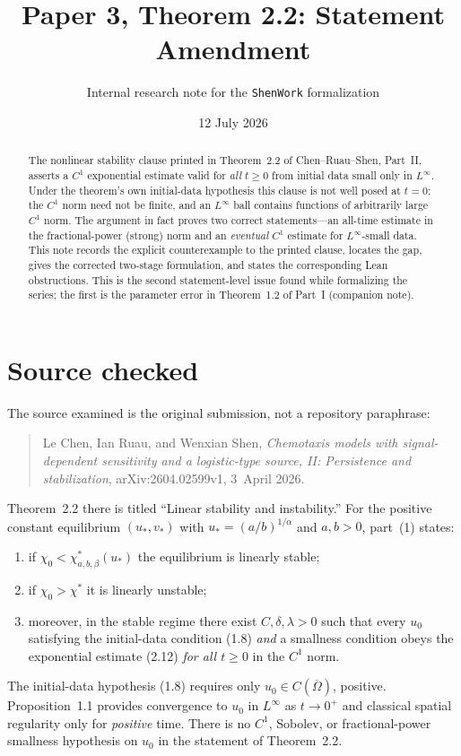 \documentclass[11pt]{article}
\title{Paper 3, Theorem 2.2: Statement Amendment}
\author{Internal research note for the \texttt{ShenWork} formalization}
\date{12 July 2026}
\newcommand{\Om}{\Omega}
\begin{document}
\maketitle

\begin{abstract}
The nonlinear stability clause printed in Theorem~2.2 of Chen--Ruau--Shen,
Part~II, asserts a $C^{1}$ exponential estimate valid for \emph{all} $t\ge 0$
from initial data small only in $L^{\infty}$.  Under the theorem's own
initial-data hypothesis this clause is not well posed at $t=0$: the $C^{1}$
norm need not be finite, and an $L^{\infty}$ ball contains functions of
arbitrarily large $C^{1}$ norm.  The argument in fact proves two correct
statements---an all-time estimate in the fractional-power (strong) norm and an
\emph{eventual} $C^{1}$ estimate for $L^{\infty}$-small data.  This note records
the explicit counterexample to the printed clause, locates the gap, gives the
corrected two-stage formulation, and states the corresponding Lean obstructions.
This is the second statement-level issue found while formalizing the series; the
first is the parameter error in Theorem~1.2 of Part~I (companion note).
\end{abstract}

\section{Source checked}

The source examined is the original submission, not a repository paraphrase:
\begin{quote}
Le Chen, Ian Ruau, and Wenxian Shen, \emph{Chemotaxis models with
signal-dependent sensitivity and a logistic-type source, II: Persistence and
stabilization}, arXiv:2604.02599v1, 3~April 2026.
\end{quote}
Theorem~2.2 there is titled ``Linear stability and instability.''  For the
positive constant equilibrium $(u_{*},v_{*})$ with $u_{*}=(a/b)^{1/\alpha}$ and
$a,b>0$, part~(1) states:
\begin{enumerate}[label=(\roman*)]
\item if $\chi_{0}<\chi^{*}_{a,b,\beta}(u_{*})$ the equilibrium is linearly
  stable;
\item if $\chi_{0}>\chi^{*}$ it is linearly unstable;
\item moreover, in the stable regime there exist $C,\delta,\lambda>0$ such that
  every $u_{0}$ satisfying the initial-data condition (1.8) \emph{and} a
  smallness condition obeys the exponential estimate (2.12) \emph{for all
  $t\ge 0$} in the $C^{1}$ norm.
\end{enumerate}
The initial-data hypothesis (1.8) requires only $u_{0}\in C(\overline{\Om})$,
positive.  Proposition~1.1 provides convergence to $u_{0}$ in $L^{\infty}$ as
$t\to 0^{+}$ and classical spatial regularity only for \emph{positive} time.
There is no $C^{1}$, Sobolev, or fractional-power smallness hypothesis on
$u_{0}$ in the statement of Theorem~2.2.
\end{document}
